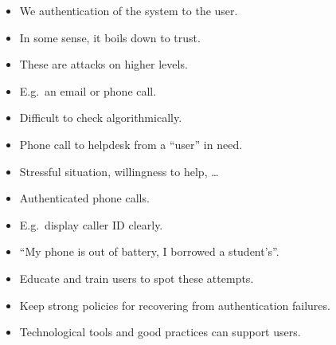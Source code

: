 \begin{frame}
  \begin{remark}
    \begin{itemize}
      \item We authentication of the system to the user.
      \item In some sense, it boils down to trust.
    \end{itemize}
  \end{remark}
\end{frame}

\begin{frame}
  \begin{remark}
    \begin{itemize}
      \item These are attacks on higher levels.
      \item E.g.\ an email or phone call.
      \item Difficult to check algorithmically.
    \end{itemize}
  \end{remark}

  \begin{example}
    \begin{itemize}
      \item Phone call to helpdesk from a \enquote{user} in need.
      \item Stressful situation, willingness to help, \dots
    \end{itemize}
  \end{example}
\end{frame}

\begin{frame}
  \begin{example}[Solution?]
    \begin{itemize}
      \item Authenticated phone calls.
      \item E.g.\ display caller ID clearly.
      \item \enquote{My phone is out of battery, I borrowed a student's}.
    \end{itemize}
  \end{example}

  \begin{solution}
    \begin{itemize}
      \item Educate and train users to spot these attempts.

      \item Keep strong policies for recovering from authentication failures. 

      \item Technological tools and good practices can support users.
    \end{itemize}
  \end{solution}
\end{frame}

